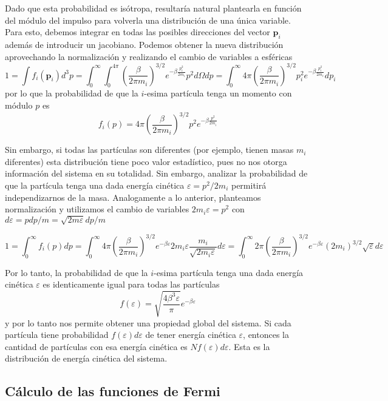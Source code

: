 Dado que esta probabilidad es isótropa, resultaría natural plantearla en función del módulo del impulso para volverla una distribución de una única variable.
Para esto, debemos integrar en todas las posibles direcciones del vector $\mathbf{p}_i$ además de introducir un jacobiano.
Podemos obtener la nueva distribución aprovechando la normalización y realizando el cambio de variables a esféricas
\[1 = \int f_i(\mathbf{p}_i) d^3p = \int_0^\infty\int_0^{4\pi}\left(\frac{\beta}{2\pi m_i} \right)^{3/2} e^{-\beta\frac{p_i^2}{2m_i}} p^2d\Omega dp
= \int_0^\infty 4\pi\left(\frac{\beta}{2\pi m_i} \right)^{3/2} p_i^2 e^{-\beta\frac{p_i^2}{2m_i}} dp_i\]
por lo que la probabilidad de que la $i$-esima partícula tenga un momento con módulo $p$ es
\[ f_i(p) = 4\pi\left(\frac{\beta}{2\pi m_i} \right)^{3/2} p^2 e^{-\beta\frac{p^2}{2m_i}} \]

Sin embargo, si todas las partículas son diferentes (por ejemplo, tienen masas $m_i$ diferentes) esta distribución tiene poco valor estadístico, pues no nos otorga información
del sistema en su totalidad.
Sin embargo, analizar la probabilidad de que la partícula tenga una dada energía cinética $\varepsilon = p^2/2m_i$ permitirá independizarnos de la masa.
Analogamente a lo anterior, planteamos normalización y utilizamos el cambio de variables $2m_i\varepsilon = p^2$ con $d\varepsilon = pdp/m = \sqrt{2m\varepsilon}dp/m$

\[ 1 = \int_0^\infty f_i(p) dp = \int_0^\infty 4\pi\left(\frac{\beta}{2\pi m_i} \right)^{3/2} e^{-\beta\varepsilon} 2m_i\varepsilon\frac{m_i}{\sqrt{2m_i\varepsilon}} d\varepsilon
= \int_0^\infty 2\pi\left(\frac{\beta}{2\pi m_i} \right)^{3/2} e^{-\beta\varepsilon} (2m_i)^{3/2}\sqrt{\varepsilon} d\varepsilon \]

Por lo tanto, la probabilidad de que la $i$-esima partícula tenga una dada energía cinética $\varepsilon$ es identicamente igual para todas las partículas
\begin{equation}
 f(\varepsilon) = \sqrt{\frac{4\beta^3\varepsilon}{\pi}}e^{-\beta\varepsilon}
\end{equation}
y por lo tanto nos permite obtener una propiedad global del sistema.
Si cada partícula tiene probabilidad $f(\varepsilon)d\varepsilon$ de tener energía cinética $\varepsilon$, entonces la cantidad de partículas con esa energía cinética es $Nf(\varepsilon)d\varepsilon$.
Esta es la distribución de energía cinética del sistema.



\subsection{Cálculo de las funciones de Fermi}

